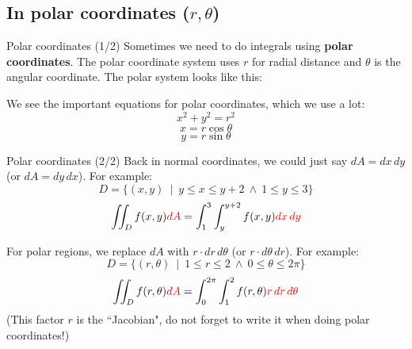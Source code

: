 \subsection{In polar coordinates ($r,\theta$)}
\begin{frame}{Polar coordinates (1/2)}
    Sometimes we need to do integrals using \textbf{polar coordinates}. The polar coordinate system uses $r$ for radial distance and $\theta$ is the angular coordinate. The polar system looks like this:

    \vspace{0.3mm}
    \begin{minipage}{0.6\textwidth}
    
    \end{minipage}
    \begin{minipage}{0.35\textwidth}
        We see the important equations for polar coordinates, which we use a lot:
        \[\boxed{x^2+y^2=r^2}\]
        \[\boxed{x=r\cos\theta}\]
        \[\boxed{y=r\sin\theta}\]
    \end{minipage}
\end{frame}

\begin{frame}{Polar coordinates (2/2)}
    Back in normal coordinates, we could just say $dA=dx\,dy$ (or $dA=dy\,dx$). For example:
    \[D=\{(x,y)~\mid~y\leq x\leq y+2~\land~1\leq y\leq 3\}\]
    \[\iint_D f(x,y) \textcolor{red}{dA} = \int_{1}^{3}\int_{y}^{y+2}f(x,y)\textcolor{red}{dx\,dy}\]

    \pause For polar regions, we replace $dA$ with $r\cdot dr\,d\theta$ (or $r\cdot d\theta\, dr$). For example:
    \[D=\{(r,\theta)~\mid~1\leq r\leq 2~\land~0\leq\theta\leq2\pi\}\]
    \[\iint_D f(r,\theta) \textcolor{red}{dA} = \int_{0}^{2\pi}\int_{1}^{2}f(r,\theta)\textcolor{red}{r\,dr\,d\theta}\]
     (This factor $r$ is the ``Jacobian", do not forget to write it when doing polar coordinates!)
\end{frame}


